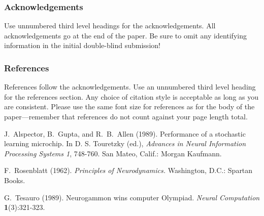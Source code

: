 \documentclass[twoside]{article}
\begin{document}
\subsubsection*{Acknowledgements}

Use unnumbered third level headings for the acknowledgements.  All
acknowledgements go at the end of the paper.  Be sure to omit any
identifying information in the initial double-blind submission!


\subsubsection*{References}

References follow the acknowledgements.  Use an unnumbered third level
heading for the references section.  Any choice of citation style is
acceptable as long as you are consistent.  Please use the same font
size for references as for the body of the paper---remember that
references do not count against your page length total.

J.~Alspector, B.~Gupta, and R.~B.~Allen (1989). Performance of a
stochastic learning microchip.  In D. S. Touretzky (ed.), {\it
  Advances in Neural Information Processing Systems 1}, 748-760.  San
Mateo, Calif.: Morgan Kaufmann.

F.~Rosenblatt (1962). {\it Principles of Neurodynamics.} Washington,
D.C.: Spartan Books.

G.~Tesauro (1989). Neurogammon wins computer Olympiad.  {\it Neural
  Computation} {\bf 1}(3):321-323.
\end{document}
